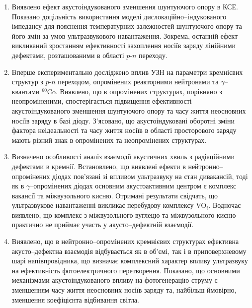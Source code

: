 \begin{enumerate}[leftmargin=0cm,itemindent=3em]
     \item Виявлено ефект акустоіндукованого зменшення шунтуючого опору в КСЕ.
      Показано доцільність використання моделі дислокаційно--індукованого імпедансу для пояснення температурних залежностей шунтуючого опору та його змін за умов ультразвукового навантаження.
      Зокрема, останній ефект викликаний зростанням ефективності захоплення носіїв заряду лінійними дефектами,
      розташованими в області $p$-$n$ переходу.



     \item Вперше експериментально досліджено вплив УЗН на параметри кремнієвих структур з $p$-$n$ переходом, опромінених  реакторними нейтронами та $\gamma$--квантами $^{60}$Co.
      Виявлено, що в опромінених структурах, порівняно з неопроміненими, спостерігається підвищення ефективності акустоіндукованого зменшення шунтуючого опору та часу життя неосновних носіїв заряду в базі діоду.
      З'ясовано, що акустоіндуковані оборотні зміни фактора неідеальності та часу життя носіїв в області просторового заряду   мають різний знак в опромінених та неопромінених структурах.

      \item Визначено особливості аналіз взаємодії акустичних хвиль з радіаційними дефектами в кремнії.
      Встановлено, що виявлені ефекти в нейтронно--опромінених діодах пов'язані зі впливом ультразвуку на стан дивакансій,  тоді як в $\gamma$--опромінених діодах основним акустоактивним центром є комплекс вакансії та міжвузольного кисню.
     Отримані результати свідчать, що ультразвукове навантаженні викликає перебудову комплексу VO$_i$.
     Водночас виявлено, що комплекс з міжвузольного вуглецю та міжвузольного кисню практично не приймає участь у
     акусто--дефектній взаємодії.


     \item Виявлено, що в нейтронно--опромінених кремнієвих структурах ефективна акусто--дефектна
     взаємодія відбувається як в об'ємі, так і в приповерхневому шарі напівпровідника, що 
визначає комплексний характер впливу ультразвуку на ефективність фотоелектричного перетворення.
Показано, що основними механізмами акустоіндукованого впливу на фотогенерацію струму є зменшенням часу життя неосновних носіїв заряду та, 
найбільш ймовірно, зменшення коефіцієнта відбивання світла.
  \end{enumerate}	

